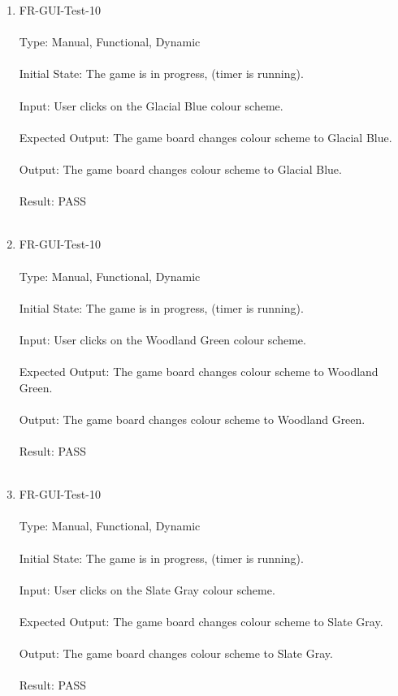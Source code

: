\documentclass[12pt, titlepage]{article}
\begin{document}
\begin{enumerate}
\newpage
\item{FR-GUI-Test-10\\\\}
Type: Manual, Functional, Dynamic\\\\				
Initial State: The game is in progress, (timer is running).\\\\
Input: User clicks on the Glacial Blue colour scheme.\\\\
Expected Output: The game board changes colour scheme to Glacial Blue.\\\\
Output: The game board changes colour scheme to Glacial Blue.\\\\
Result: PASS\\\\

\item{FR-GUI-Test-10\\\\}
Type: Manual, Functional, Dynamic\\\\				
Initial State: The game is in progress, (timer is running).\\\\
Input: User clicks on the Woodland Green colour scheme.\\\\
Expected Output: The game board changes colour scheme to Woodland Green.\\\\
Output: The game board changes colour scheme to Woodland Green.\\\\
Result: PASS\\\\

\newpage
\item{FR-GUI-Test-10\\\\}
Type: Manual, Functional, Dynamic\\\\				
Initial State: The game is in progress, (timer is running).\\\\
Input: User clicks on the Slate Gray colour scheme.\\\\
Expected Output: The game board changes colour scheme to Slate Gray.\\\\
Output: The game board changes colour scheme to Slate Gray.\\\\
Result: PASS\\\\


\end{enumerate}
\end{document}
